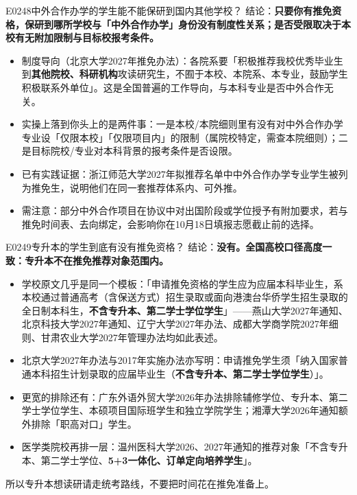 \begin{qa}{E0248}{中外合作办学的学生能不能保研到国内其他学校？}
结论：\textbf{只要你有推免资格，保研到哪所学校与「中外合作办学」身份没有制度性关系；是否受限取决于本校有无附加限制与目标校报考条件。}
\begin{itemize}
  \item 制度导向（北京大学2027年推免办法）：各院系要「积极推荐我校优秀毕业生到\textbf{其他院校、科研机构}攻读研究生，不囿于本校、本院系、本专业，鼓励学生积极联系外单位」。这是全国普遍的工作导向，与本科专业是否中外合作无关。
  \item 实操上落到你头上的是两件事：一是本校/本院细则里有没有对中外合作办学专业设「仅限本校」「仅限项目内」的限制（属院校特定，需查本院细则）；二是目标院校/专业对本科背景的报考条件是否设限。
  \item 已有实践证据：浙江师范大学2027年拟推荐名单中中外合作办学专业学生被列为推免生，说明他们在同一套推荐体系内、可外推。
  \item 需注意：部分中外合作项目在协议中对出国阶段或学位授予有附加要求，若与推免时间表、去向绑定，会影响你在10月18日填报志愿截止前的选择。
\end{itemize}
\end{qa}

\begin{qa}{E0249}{专升本的学生到底有没有推免资格？}
结论：\textbf{没有。全国高校口径高度一致：专升本不在推免推荐对象范围内。}
\begin{itemize}
  \item 学校原文几乎是同一个模板：「申请推免资格的学生应为应届本科毕业生，系本校通过普通高考（含保送方式）招生录取或面向港澳台华侨学生招生录取的全日制本科生，\textbf{不含专升本、第二学士学位学生}」——燕山大学2027年通知、北京科技大学2027年通知、辽宁大学2027年办法、成都大学商学院2027年细则、甘肃农业大学2027年管理办法均如此表述。
  \item 北京大学2027年办法与2017年实施办法亦写明：申请推免学生须「纳入国家普通本科招生计划录取的应届毕业生（\textbf{不含专升本、第二学士学位学生}）」。
  \item 更宽的排除还有：广东外语外贸大学2026年办法排除辅修学位、专升本、第二学士学位学生、本硕项目国际班学生和独立学院学生；湘潭大学2026年通知额外排除「职高对口」学生。
  \item 医学类院校再排一层：温州医科大学2026、2027年通知的推荐对象「不含专升本、第二学士学位、\textbf{5+3一体化、订单定向培养学生}」。
\end{itemize}
所以专升本想读研请走统考路线，不要把时间花在推免准备上。
\end{qa}

